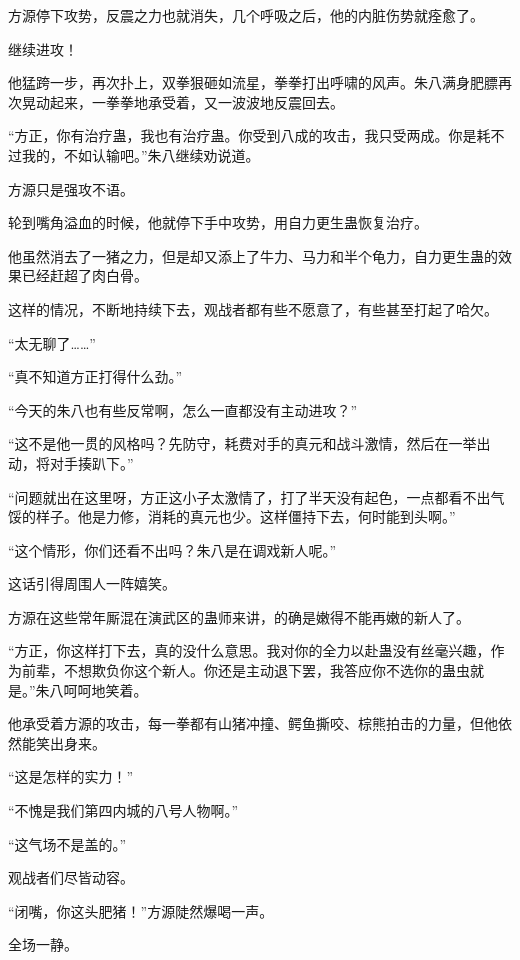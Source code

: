\begin{this_body}
方源停下攻势，反震之力也就消失，几个呼吸之后，他的内脏伤势就痊愈了。

继续进攻！

他猛跨一步，再次扑上，双拳狠砸如流星，拳拳打出呼啸的风声。朱八满身肥膘再次晃动起来，一拳拳地承受着，又一波波地反震回去。

“方正，你有治疗蛊，我也有治疗蛊。你受到八成的攻击，我只受两成。你是耗不过我的，不如认输吧。”朱八继续劝说道。

方源只是强攻不语。

轮到嘴角溢血的时候，他就停下手中攻势，用自力更生蛊恢复治疗。

他虽然消去了一猪之力，但是却又添上了牛力、马力和半个龟力，自力更生蛊的效果已经赶超了肉白骨。

这样的情况，不断地持续下去，观战者都有些不愿意了，有些甚至打起了哈欠。

“太无聊了……”

“真不知道方正打得什么劲。”

“今天的朱八也有些反常啊，怎么一直都没有主动进攻？”

“这不是他一贯的风格吗？先防守，耗费对手的真元和战斗激情，然后在一举出动，将对手揍趴下。”

“问题就出在这里呀，方正这小子太激情了，打了半天没有起色，一点都看不出气馁的样子。他是力修，消耗的真元也少。这样僵持下去，何时能到头啊。”

“这个情形，你们还看不出吗？朱八是在调戏新人呢。”

这话引得周围人一阵嬉笑。

方源在这些常年厮混在演武区的蛊师来讲，的确是嫩得不能再嫩的新人了。

“方正，你这样打下去，真的没什么意思。我对你的全力以赴蛊没有丝毫兴趣，作为前辈，不想欺负你这个新人。你还是主动退下罢，我答应你不选你的蛊虫就是。”朱八呵呵地笑着。

他承受着方源的攻击，每一拳都有山猪冲撞、鳄鱼撕咬、棕熊拍击的力量，但他依然能笑出身来。

“这是怎样的实力！”

“不愧是我们第四内城的八号人物啊。”

“这气场不是盖的。”

观战者们尽皆动容。

“闭嘴，你这头肥猪！”方源陡然爆喝一声。

全场一静。

\end{this_body}

